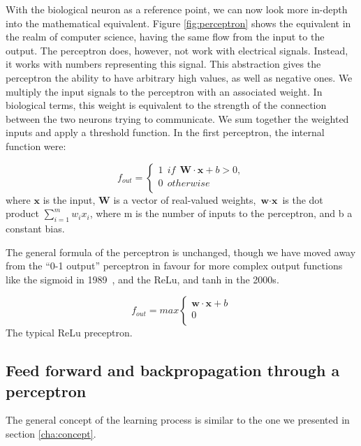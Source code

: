 With the biological neuron as a reference point, we can now look more in-depth into the mathematical equivalent. 
Figure \ref{fig:perceptron} shows the equivalent in the realm of computer science, having the same flow from the input to the output. 
The perceptron does, however, not work with electrical signals. Instead, it works with numbers representing this signal. This abstraction gives the perceptron the ability to have arbitrary high values, as well as negative ones. 
We multiply the input signals to the perceptron with an associated weight. In biological terms, this weight is equivalent to the strength of the connection between the two neurons trying to communicate. We sum together the weighted inputs and apply a threshold function. In the first perceptron, the internal function were:


\begin{equation}
    \label{eq:tresh}
 f_{out}=   \left\{
\begin{array}{ll}
		1 \ \ if \ \ \textbf{W} \cdot \textbf{x} + b > 0, \\
     	0 \ \ otherwise \\
\end{array} 
\right. 
\end{equation}
where $\textbf{x}$ is the input, $\textbf{W}$ is a vector of real-valued weights, $\textbf{w} \cdot \textbf{x}$ is the dot product $\sum _{i=1}^{m}w_{i}x_{i}$, where m is the number of inputs to the perceptron, and b a constant bias. 


The general formula of the perceptron is unchanged, though we have moved away from the ``0-1 output'' perceptron in favour for more complex output functions like the sigmoid in 1989~\cite{Funahashi:1989:ARC:71287.71290}, and the ReLu, and tanh in the 2000s. 

\begin{equation}
    \label{eq:ReLu}
 f_{out}=   max\left\{
\begin{array}{ll}
		\textbf{w} \cdot \textbf{x} + b \\
     	0 \\
\end{array} 
\right. 
\end{equation}
The typical ReLu preceptron.



\subsection{Feed forward and backpropagation through a perceptron}
The general concept of the learning process is similar to the one we presented in section \ref{cha:concept}.

